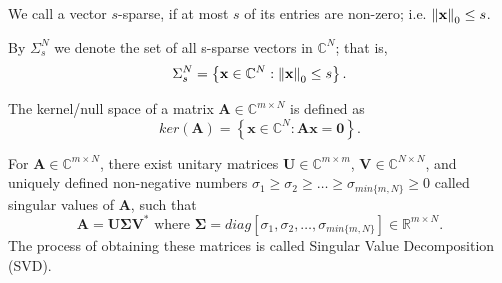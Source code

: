 \begin{tight_equations}
\begin{definition}[sparsity]
We call a vector $s$-sparse, if at most $s$ of its entries are non-zero; i.e. $\left\lVert\mathbf{x}\right\rVert_0 \le s$.
\end{definition}

\begin{notation}
By $\Sigma_s^N$ we denote the set of all s-sparse vectors in $\mathbb{C}^N$; that is,
\[\Sigma_s^N = \left\{\mathbf{x} \in \mathbb{C}^N : \left\lVert\mathbf{x}\right\rVert_0 \le s \right\}.\]
\end{notation}



\begin{definition}
The kernel/null space of a matrix $\mathbf{A} \in \mathbb{C}^{m \times N}$ is defined as
\[ker(\mathbf{A}) = \left\{\mathbf{x} \in \mathbb{C}^N : \mathbf{Ax} = \mathbf{0}\right\}.\]
\end{definition}

\begin{theorem}[SVD]
For $\mathbf{A} \in \mathbb{C}^{m \times N}$, there exist unitary matrices $\mathbf{U} \in \mathbb{C}^{m \times m}$, $\mathbf{V} \in \mathbb{C}^{N \times N}$, and uniquely defined non-negative numbers $\sigma_1 \ge \sigma_2 \ge \ldots \ge \sigma_{min\{m,N\}} \ge 0$ called singular values of $\mathbf{A}$, such that 
\[\mathbf{A} = \mathbf{U \Sigma V^*} \text{ where } \mathbf{\Sigma} = diag[\sigma_1, \sigma_2, \ldots, \sigma_{min\{m,N\}}] \in \mathbb{R}^{m \times N}.\]
The process of obtaining these matrices is called Singular Value Decomposition (SVD).
\end{theorem}

\end{tight_equations}

